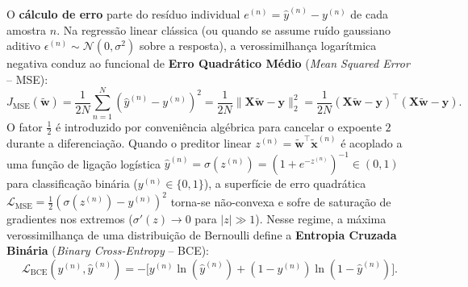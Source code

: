 \documentclass[runningheads]{llncs}
\begin{document}
O \textbf{c\'{a}lculo de erro} parte do res\'{i}duo individual $e^{(n)} = \hat{y}^{(n)} - y^{(n)}$ de cada amostra $n$. Na regress\~{a}o linear cl\'{a}ssica (ou quando se assume ru\'{i}do gaussiano aditivo $\epsilon^{(n)} \sim \mathcal{N}(0, \sigma^2)$ sobre a resposta), a verossimilhan\c{c}a logar\'{i}tmica negativa conduz ao funcional de \textbf{Erro Quadr\'{a}tico M\'{e}dio} (\textit{Mean Squared Error} -- MSE):
\begin{equation}
    J_{\text{MSE}}(\tilde{\mathbf{w}}) = \frac{1}{2N} \sum_{n=1}^{N} \left(\hat{y}^{(n)} - y^{(n)}\right)^2 = \frac{1}{2N} \|\mathbf{X}\tilde{\mathbf{w}} - \mathbf{y}\|_2^2 = \frac{1}{2N} (\mathbf{X}\tilde{\mathbf{w}} - \mathbf{y})^\top (\mathbf{X}\tilde{\mathbf{w}} - \mathbf{y}).
    \label{eq:mse_matrix}
\end{equation}
O fator $\frac{1}{2}$ \'{e} introduzido por conveni\^{e}ncia alg\'{e}brica para cancelar o expoente $2$ durante a diferencia\c{c}\~{a}o. Quando o preditor linear $z^{(n)} = \tilde{\mathbf{w}}^\top \tilde{\mathbf{x}}^{(n)}$ \'{e} acoplado a uma fun\c{c}\~{a}o de liga\c{c}\~{a}o log\'{i}stica $\hat{y}^{(n)} = \sigma(z^{(n)}) = (1 + e^{-z^{(n)}})^{-1} \in (0, 1)$ para classifica\c{c}\~{a}o bin\'{a}ria ($y^{(n)} \in \{0, 1\}$), a superf\'{i}cie de erro quadr\'{a}tica $\mathcal{L}_{\text{MSE}} = \frac{1}{2}(\sigma(z^{(n)}) - y^{(n)})^2$ torna-se n\~{a}o-convexa e sofre de satura\c{c}\~{a}o de gradientes nos extremos ($\sigma'(z) \to 0$ para $|z| \gg 1$). Nesse regime, a máxima verossimilhan\c{c}a de uma distribui\c{c}\~{a}o de Bernoulli define a \textbf{Entropia Cruzada Bin\'{a}ria} (\textit{Binary Cross-Entropy} -- BCE):
\begin{equation}
    \mathcal{L}_{\text{BCE}}(y^{(n)}, \hat{y}^{(n)}) = -\Big[ y^{(n)} \ln(\hat{y}^{(n)}) + (1 - y^{(n)}) \ln(1 - \hat{y}^{(n)}) \Big].
    \label{eq:bce_loss}
\end{equation}
\end{document}
